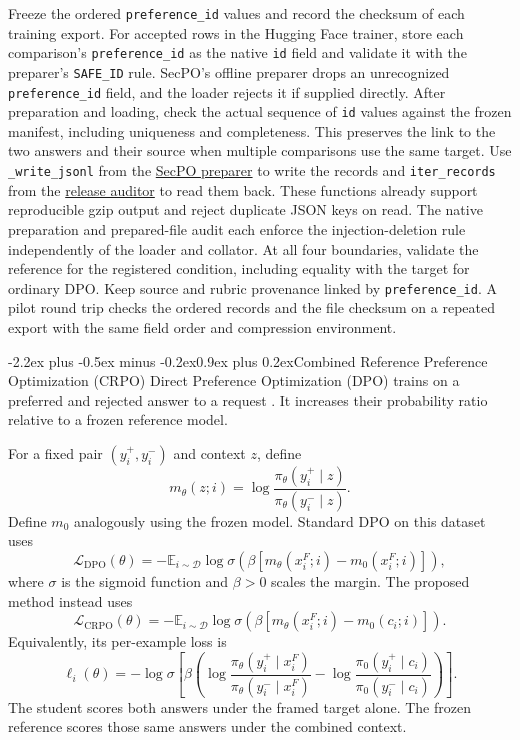 \documentclass[11pt]{article}
\makeatletter
\renewcommand\section{\@startsection{section}{1}{\z@}%
  {-2.2ex plus -0.5ex minus -0.2ex}{0.9ex plus 0.2ex}{\normalfont\Large\bfseries}}
\makeatother
\begin{document}
Freeze the ordered \texttt{preference\_id} values and record the checksum of each training export. For accepted rows in the Hugging Face trainer, store each comparison's \texttt{preference\_id} as the native \texttt{id} field and validate it with the preparer's \texttt{SAFE\_ID} rule. SecPO's offline preparer drops an unrecognized \texttt{preference\_id} field, and the loader rejects it if supplied directly. After preparation and loading, check the actual sequence of \texttt{id} values against the frozen manifest, including uniqueness and completeness. This preserves the link to the two answers and their source when multiple comparisons use the same target. Use \texttt{\_write\_jsonl} from the \href{https://github.com/Sizhe-Chen/SecPO/blob/da0372a0e598badf4e51c98c175a962147cac2ac/scripts/prepare_preferences.py}{SecPO preparer} to write the records and \texttt{iter\_records} from the \href{https://github.com/Sizhe-Chen/SecPO/blob/da0372a0e598badf4e51c98c175a962147cac2ac/scripts/audit_release_dataset.py}{release auditor} to read them back. These functions already support reproducible gzip output and reject duplicate JSON keys on read. The native preparation and prepared-file audit each enforce the injection-deletion rule independently of the loader and collator. At all four boundaries, validate the reference for the registered condition, including equality with the target for ordinary DPO. Keep source and rubric provenance linked by \texttt{preference\_id}. A pilot round trip checks the ordered records and the file checksum on a repeated export with the same field order and compression environment.

\section{Combined Reference Preference Optimization (CRPO)}
Direct Preference Optimization (DPO) trains on a preferred and rejected answer to a request \cite{rafailov2023dpo}. It increases their probability ratio relative to a frozen reference model.

For a fixed pair $(y_i^+,y_i^-)$ and context $z$, define
\[
m_\theta(z;i)
=\log\frac{\pi_\theta(y_i^+\mid z)}{\pi_\theta(y_i^-\mid z)}.
\]
Define $m_0$ analogously using the frozen model. Standard DPO on this dataset uses
\[
\mathcal L_{\mathrm{DPO}}(\theta)
=-\mathbb E_{i\sim\mathcal D}
\log\sigma\!\left(\beta[m_\theta(x_i^F;i)-m_0(x_i^F;i)]\right),
\]
where $\sigma$ is the sigmoid function and $\beta>0$ scales the margin. The proposed method instead uses
\[
\boxed{
\mathcal L_{\mathrm{CRPO}}(\theta)
=-\mathbb E_{i\sim\mathcal D}
\log\sigma\!\left(\beta[m_\theta(x_i^F;i)-m_0(c_i;i)]\right)
}.
\]
Equivalently, its per-example loss is
\[
\ell_i(\theta)
=-\log\sigma\!\left[
\beta\left(
\log\frac{\pi_\theta(y_i^+\mid x_i^F)}{\pi_\theta(y_i^-\mid x_i^F)}
-\log\frac{\pi_0(y_i^+\mid c_i)}{\pi_0(y_i^-\mid c_i)}
\right)\right].
\]
The student scores both answers under the framed target alone. The frozen reference scores those same answers under the combined context.
\end{document}
